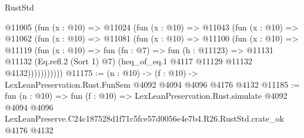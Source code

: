 \begin{lexlean}{RustStd}
\begin{coremodule}
        @11005
          (fun (x : @10) =>
          @11024
            (fun (x : @10) =>
            @11043
              (fun (x : @10) =>
              @11062
                (fun (x : @10) =>
                @11081
                  (fun (x : @10) =>
                  @11100
                    (fun (x : @10) =>
                    @11119
                      (fun (x : @10) =>
                      fun (fn : @7) =>
                      fun (h : @11123) =>
                      @11131
                        @11132
                        (Eq.refl.{2} (Sort 1) @7)
                        (heq_of_eq.{1} @4117 @11129 @11132 @4132)))))))))))
@11175 := (n : @10) -> (f : @10) -> LexLeanPreservation.Rust.FunSem @4092 @4094 @4096 @4176 @4132
@11185 := fun (n : @10) =>
  fun (f : @10) =>
  LexLeanPreservation.Rust.simulate
    @4092
    @4094
    @4096
    LexLeanPreserve.C24c187528d1f71c5fce57d0056e4e7b4.R26.RustStd.crate_ok
    @4176
    @4132
\end{coremodule}
\end{lexlean}
